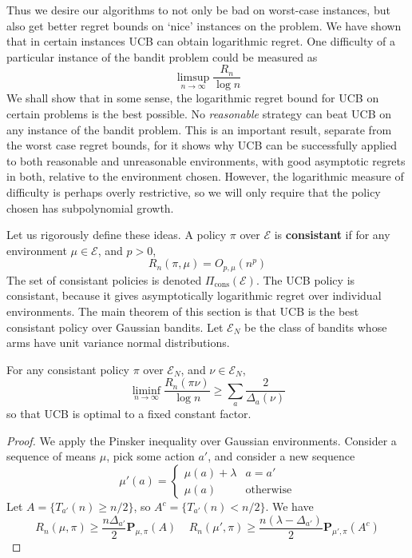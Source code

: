 Thus we desire our algorithms to not only be bad on worst-case instances, but also get better regret bounds on `nice' instances on the problem. We have shown that in certain instances UCB can obtain logarithmic regret. One difficulty of a particular instance of the bandit problem could be measured as
%
\[ \limsup_{n \to \infty} \frac{R_n}{\log n} \]
%
We shall show that in some sense, the logarithmic regret bound for UCB on certain problems is the best possible. No {\it reasonable} strategy can beat UCB on any instance of the bandit problem. This is an important result, separate from the worst case regret bounds, for it shows why UCB can be successfully applied to both reasonable and unreasonable environments, with good asymptotic regrets in both, relative to the environment chosen. However, the logarithmic measure of difficulty is perhaps overly restrictive, so we will only require that the policy chosen has subpolynomial growth.

Let us rigorously define these ideas. A policy $\pi$ over $\mathcal{E}$ is {\bf consistant} if for any environment $\mu \in \mathcal{E}$, and $p > 0$,
%
\[ R_n(\pi, \mu) = O_{p, \mu}(n^p) \]
%
The set of consistant policies is denoted $\Pi_{\text{cons}}(\mathcal{E})$. The UCB policy is consistant, because it gives asymptotically logarithmic regret over individual environments. The main theorem of this section is that UCB is the best consistant policy over Gaussian bandits. Let $\mathcal{E}_N$ be the class of bandits whose arms have unit variance normal distributions.

\begin{theorem}
    For any consistant policy $\pi$ over $\mathcal{E}_N$, and $\nu \in \mathcal{E}_N$,
    \[ \liminf_{n \to \infty} \frac{R_n(\pi \nu)}{\log n} \geq \sum_a \frac{2}{\Delta_a(\nu)} \]
    so that UCB is optimal to a fixed constant factor.
\end{theorem}
\begin{proof}
    We apply the Pinsker inequality over Gaussian environments. Consider a sequence of means $\mu$, pick some action $a'$, and consider a new sequence
    \[ \mu'(a) = \begin{cases} \mu(a) + \lambda & a = a' \\ \mu(a) & \text{otherwise} \end{cases} \]
    Let $A = \{ T_{a'}(n) \geq n/2 \}$, so $A^c = \{ T_{a'}(n) < n/2 \}$. We have
    \[ R_n(\mu, \pi) \geq \frac{n \Delta_{a'}}{2} \mathbf{P}_{\mu, \pi}(A) \ \ \ \ \ R_n(\mu', \pi) \geq \frac{n(\lambda - \Delta_{a'})}{2} \mathbf{P}_{\mu', \pi}(A^c) \]
\end{proof}

